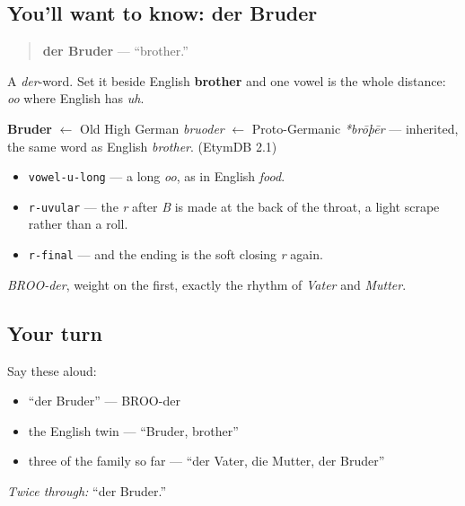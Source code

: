 \subsection*{You'll want to know: der Bruder}
\begin{quote}
\textbf{der Bruder} — \textquotedblleft{}brother.\textquotedblright{}
\end{quote}

A \emph{der}-word. Set it beside English \textbf{brother} and one vowel is the whole distance: \emph{oo} where English has \emph{uh}.

\begin{cousinweb}
\textbf{Bruder} $\leftarrow$ Old High German \emph{bruoder} $\leftarrow$ Proto-Germanic \emph{*brōþēr} — inherited, the same word as English \emph{brother}. (EtymDB 2.1)
\end{cousinweb}

\begin{sounds}
\begin{itemize}
\raggedright
  \item \texttt{vowel-u-long} — a long \emph{oo}, as in English \emph{food}.
  \item \texttt{r-uvular} — the \emph{r} after \emph{B} is made at the back of the throat, a light scrape rather than a roll.
  \item \texttt{r-final} — and the ending is the soft closing \emph{r} again.
\end{itemize}

\emph{BROO-der}, weight on the first, exactly the rhythm of \emph{Vater} and \emph{Mutter}.
\end{sounds}

\subsection*{Your turn}
Say these aloud:

\begin{itemize}
\raggedright
  \item \textquotedblleft{}der Bruder\textquotedblright{} — BROO-der
  \item the English twin — \textquotedblleft{}Bruder, brother\textquotedblright{}
  \item three of the family so far — \textquotedblleft{}der Vater, die Mutter, der Bruder\textquotedblright{}
\end{itemize}

\emph{Twice through:} \textquotedblleft{}der Bruder.\textquotedblright{}

